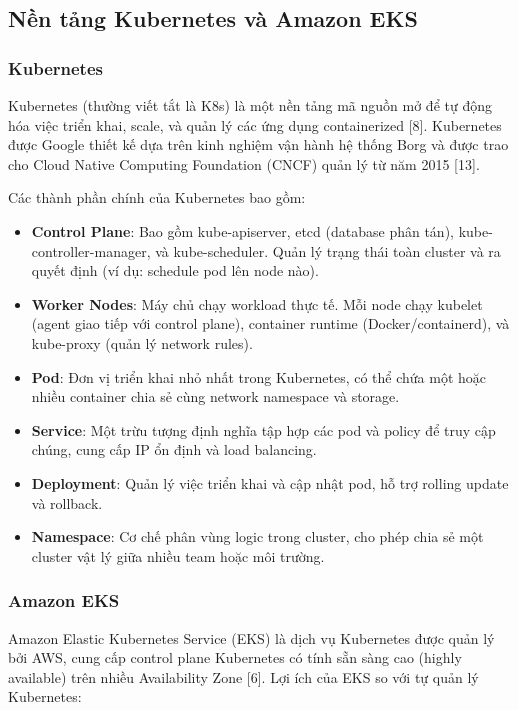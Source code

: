 \documentclass[13pt,a4paper,twoside]{extarticle}
\begin{document}
\subsection{Nền tảng Kubernetes và Amazon EKS}

\subsubsection{Kubernetes}

Kubernetes (thường viết tắt là K8s) là một nền tảng mã nguồn mở để tự động hóa việc triển khai, scale, và quản lý các ứng dụng containerized [8]. Kubernetes được Google thiết kế dựa trên kinh nghiệm vận hành hệ thống Borg và được trao cho Cloud Native Computing Foundation (CNCF) quản lý từ năm 2015 [13].

Các thành phần chính của Kubernetes bao gồm:

\begin{itemize}[leftmargin=*,nosep]
  \item \textbf{Control Plane}: Bao gồm kube-apiserver, etcd (database phân tán), kube-controller-manager, và kube-scheduler. Quản lý trạng thái toàn cluster và ra quyết định (ví dụ: schedule pod lên node nào).
  \item \textbf{Worker Nodes}: Máy chủ chạy workload thực tế. Mỗi node chạy kubelet (agent giao tiếp với control plane), container runtime (Docker/containerd), và kube-proxy (quản lý network rules).
  \item \textbf{Pod}: Đơn vị triển khai nhỏ nhất trong Kubernetes, có thể chứa một hoặc nhiều container chia sẻ cùng network namespace và storage.
  \item \textbf{Service}: Một trừu tượng định nghĩa tập hợp các pod và policy để truy cập chúng, cung cấp IP ổn định và load balancing.
  \item \textbf{Deployment}: Quản lý việc triển khai và cập nhật pod, hỗ trợ rolling update và rollback.
  \item \textbf{Namespace}: Cơ chế phân vùng logic trong cluster, cho phép chia sẻ một cluster vật lý giữa nhiều team hoặc môi trường.
\end{itemize}

\subsubsection{Amazon EKS}

Amazon Elastic Kubernetes Service (EKS) là dịch vụ Kubernetes được quản lý bởi AWS, cung cấp control plane Kubernetes có tính sẵn sàng cao (highly available) trên nhiều Availability Zone [6]. Lợi ích của EKS so với tự quản lý Kubernetes:
\end{document}
